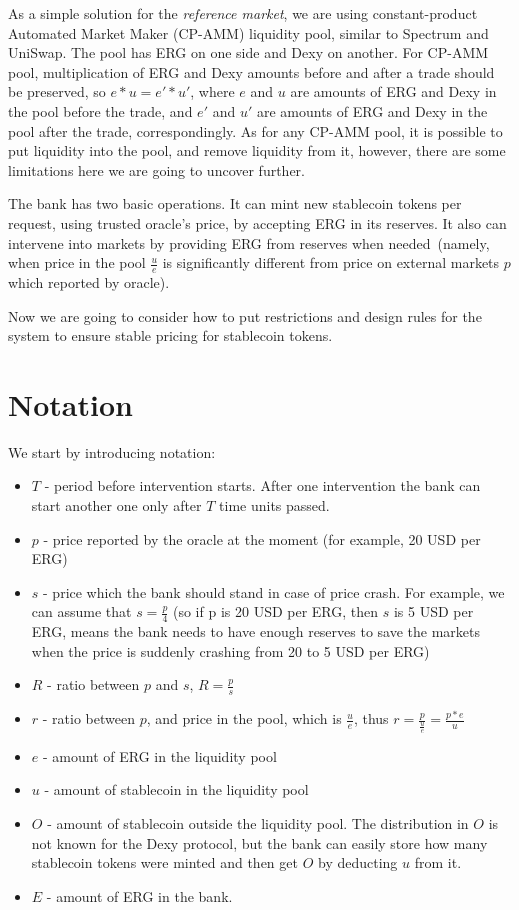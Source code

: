 \documentclass{article}   %
\newcommand{\bc}{ERG}
\newcommand{\stc}{stablecoin}
\newcommand{\sct}{stablecoin}
\newcommand{\dx}{Dexy}
\begin{document}
As a simple solution for the {\em reference market}, we are using constant-product Automated Market Maker (CP-AMM) liquidity pool, similar to Spectrum and UniSwap. The pool has \bc{} on one side and \dx{} on another. For CP-AMM pool, multiplication of \bc{} and \dx{} amounts before and after a trade should be preserved, so $e * u = e' * u'$, where $e$ and $u$ are amounts of \bc{} and \dx{} in the pool before the trade, and $e'$ and $u'$ are amounts of \bc{} and \dx{} in the pool after the trade, correspondingly. As for any CP-AMM pool, it is possible to put liquidity into the pool, and remove liquidity from it, however, there are some limitations here we are going to uncover further. 

The bank has two basic operations. It can mint new \sct{} tokens per request, using trusted oracle's price, by accepting \bc{} in its reserves. It also can intervene into markets by providing \bc{} from reserves when needed~(namely, when price in the pool $\frac{u}{e}$ is significantly different from price on external markets $p$ which reported by oracle).

Now we are going to consider how to put restrictions and design rules for the system to ensure stable pricing for \sct{} tokens. 

\section{Notation}

We start by introducing notation: 
\begin{itemize}
  \item{} $T$ - period before intervention starts. After one intervention the bank can start another one only after $T$ time units passed. 
  \item{} $p$ - price reported by the oracle at the moment (for example, 20 USD per ERG)
  \item{} $s$ - price which the bank should stand in case of price crash. For example, we can assume that $s = \frac{p}{4}$ (so if p is 20 USD per ERG, then $s$ is 5 USD per ERG, means the bank needs to have enough reserves to save the markets when the price is suddenly crashing from 20 to 5 USD per ERG)
  \item{} $R$ - ratio between $p$ and $s$, $R = \frac{p}{s}$
  \item{} $r$ - ratio between $p$, and price in the pool, which is $\frac{u}{e}$, thus $r = \frac{p}{\frac{u}{e}} = \frac{p*e}{u}$
  \item{} $e$ - amount of \bc{} in the liquidity pool 
  \item{} $u$ - amount of \stc{} in the liquidity pool
  \item{} $O$ - amount of \stc{} outside the liquidity pool. The distribution in $O$ is not known for the \dx{} protocol, but the bank can easily store how many \sct{} tokens were minted and then get $O$ by deducting $u$ from it.
  \item{} $E$ - amount of \bc{} in the bank. 
\end{itemize}  
\end{document}
